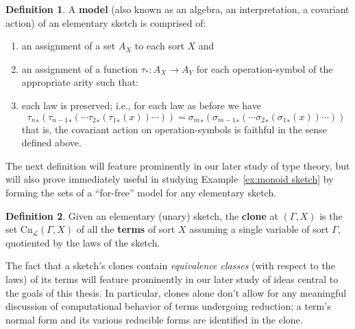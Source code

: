 \documentclass[12pt,twoside]{reedthesis}
\theoremstyle{definition}
\newtheorem{definition}{Definition}
\theoremstyle{remark}
\theoremstyle{plain}
\begin{document}
\begin{definition}\label{def:model}
  A \textbf{model} (also known as an algebra, an interpretation, a covariant
  action) of an elementary sketch is comprised of:
  \begin{enumerate}
    \item an assignment of a set $A_X$ to each sort $X$ and
    \item an assignment of a function $\tau_* : A_X \rightarrow A_Y$ for each
    operation-symbol of the appropriate arity such that:
    \item each law is preserved; i.e., for each law as before we have
    \[ {\tau_n}_* ({\tau_{n-1}}_* (\cdots {\tau_2}_* ({\tau_1}_* (x))\cdots )) = {\sigma_m}_* ({\sigma_{m-1}}_*(\cdots {\sigma_2}_* ({\sigma_1}_* (x))\cdots )) \]
    that is, the covariant action on operation-symbols is faithful in
    the sense defined above.
  \end{enumerate}
\end{definition}

The next definition will feature prominently in our later study of type theory,
but will also prove immediately useful in studying Example~\ref{ex:monoid
  sketch} by forming the sets of a ``for-free'' model for any elementary sketch.

\begin{definition}\label{def:clone}
  Given an elementary (unary) sketch, the \textbf{clone} at \( (\Gamma, X) \) is
  the set \( \text{Cn}_{\mathcal{L}} (\Gamma, X) \) of all the \textbf{terms} of sort
  $X$ assuming a single variable of sort $\Gamma$, quotiented by the laws of the
  sketch.
\end{definition}
The fact that a sketch's clones contain \emph{equivalence classes} (with respect
to the laws) of its terms will feature prominently in our later study of ideas
central to the goals of this thesis. In particular, clones alone don't allow for
any meaningful discussion of computational behavior of terms undergoing
reduction; a term's normal form and its various reducible forms are identified
in the clone.
\end{document}

